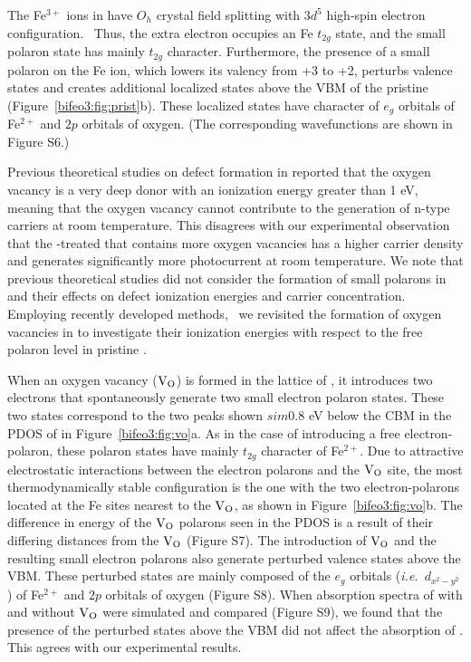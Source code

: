 The Fe$^{3+}$ ions in  have $O_h$ crystal field splitting with $3d^5$ high-spin electron configuration.~\cite{baettig2005first} Thus, the extra electron occupies an Fe $t_{2g}$ state, and the small polaron state has mainly $t_{2g}$ character. Furthermore, the presence of a small polaron on the Fe ion, which lowers its valency from +3 to +2, perturbs valence states and creates additional localized states above the VBM of the pristine  (Figure~\ref{bifeo3:fig:prist}b). These localized states have character of $e_g$ orbitals of Fe$^{2+}$ and $2p$ orbitals of oxygen. (The corresponding wavefunctions are shown in Figure S6.)


Previous theoretical studies on defect formation in  reported that the oxygen vacancy is a very deep donor with an ionization energy greater than 1 eV,~\cite{paudel2012intrinsic,kay2006new,zhang2010density,shimada2016multiferroic} meaning that the oxygen vacancy cannot contribute to the generation of n-type carriers at room temperature. This disagrees with our experimental observation that the -treated  that contains more oxygen vacancies has a higher carrier density and generates significantly more photocurrent at room temperature. We note that previous theoretical studies did not consider the formation of small polarons in  and their effects on defect ionization energies and carrier concentration. Employing recently developed methods,~\cite{smart2017effect,seo2018role} we revisited the formation of oxygen vacancies in  to investigate their ionization energies with respect to the free polaron level in pristine .

When an oxygen vacancy ($\rm V_O$) is formed in the lattice of , it introduces two electrons that spontaneously generate two small electron polaron states. These two states correspond to the two peaks shown $sim$0.8 eV below the CBM in the PDOS of  in Figure~\ref{bifeo3:fig:vo}a. As in the case of introducing a free electron-polaron, these polaron states have mainly $t_{2g}$ character of Fe$^{2+}$. Due to attractive electrostatic interactions between the electron polarons and the $\rm V_O$ site, the most thermodynamically stable configuration is the one with the two electron-polarons located at the Fe sites nearest to the $\rm V_O$, as shown in Figure~\ref{bifeo3:fig:vo}b. The difference in energy of the $\rm V_O$ polarons seen in the PDOS is a result of their differing distances from the $\rm V_O$ (Figure S7). The introduction of $\rm V_O$ and the resulting small electron polarons also generate perturbed valence states above the VBM. These perturbed states are mainly composed of the $e_g$ orbitals (\textit{i.e.}\ $d_{x^2-y^2}$) of Fe$^{2+}$ and $2p$ orbitals of oxygen (Figure S8). When absorption spectra of  with and without $\rm V_O$ were simulated and compared (Figure S9), we found that the presence of the perturbed states above the VBM did not affect the absorption of . This agrees with our experimental results.


